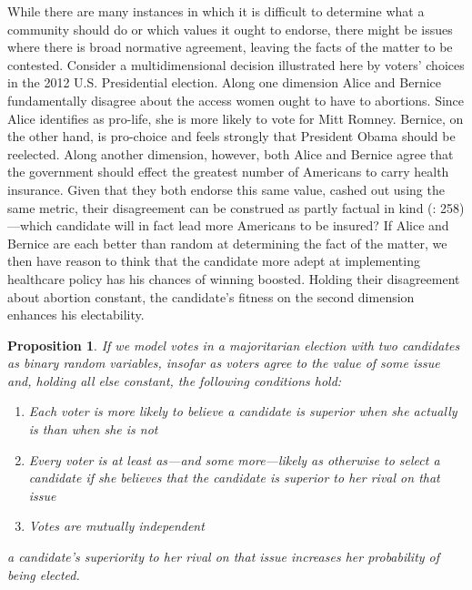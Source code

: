 \documentclass[11pt]{article}
\newtheorem*{prop*}{Proposition}
\begin{document}
While there are many instances in which it is difficult to determine what a community should do or which values it ought to endorse, there might be issues where there is broad normative agreement, leaving the facts of the matter to be contested.
 Consider a multidimensional decision illustrated here by voters' choices in the 2012 U.S. Presidential election. Along one dimension Alice and Bernice fundamentally disagree about the access women ought to have to abortions. Since Alice identifies as pro-life, she is more likely to vote for Mitt Romney. Bernice, on the other hand, is pro-choice and feels strongly that President Obama should be reelected. Along another dimension, however, both Alice and Bernice agree that the government should effect the greatest number of Americans to carry health insurance. Given that they both endorse this same value, cashed out using the same metric, their disagreement can be construed as partly factual in kind (\citet{Page2007}: 258)---which candidate will in fact lead more Americans to be insured? If Alice and Bernice are each better than random at determining the fact of the matter, we then have reason to think that the candidate more adept at implementing healthcare policy has his chances of winning boosted. Holding their disagreement about abortion constant, the candidate's fitness on the second dimension enhances his electability.

\begin{prop*}
If we model votes in a majoritarian election with two candidates as
binary random variables, insofar as voters agree to the value of some
issue and, holding all else constant, the following conditions hold:
\begin{enumerate}
	\item Each voter is more likely to believe a candidate is
          superior when she actually is than when she is not\label{ass:belief}%
	\item Every voter is at least as---and some more---likely as otherwise to select a candidate if she believes  that the candidate is superior to her rival on that issue\label{ass:preference}  %
	\item Votes are mutually independent\label{ass:independent}
\end{enumerate}
a candidate's superiority to her rival on that issue increases her probability of being elected.
\end{prop*}
\end{document}
